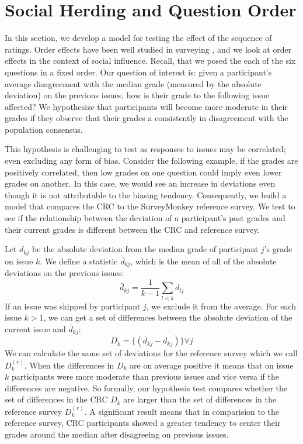 \section{Social Herding and Question Order}
\label{path}
In this section, we develop a model for testing the effect of the sequence of ratings.
Order effects have been well studied in surveying \cite{krosnick1987evaluation}, and we look at order effects in the context of social influence. 
Recall, that we posed the each of the six questions in a fixed order.
Our question of interest is: given a participant's average disagreement with the median grade (measured by the absolute deviation) on the previous issues, how is their grade to the following issue affected?
We hypothesize that participants will become more moderate in their grades if they observe that their grades a consistently in disagreement with the population consensus.

This hypothesis is challenging to test as responses to issues may be correlated; even excluding any form of bias.
Consider the following example, if the grades are positively correlated, then low grades on one question could imply even lower grades on another.
In this case, we would see an increase in deviations even though it is not attributable to the biasing tendency.
Consequently, we build a model that compares the CRC to the SurveyMonkey reference survey.
We test to see if the relationship between the deviation of a participant's past grades and their current grades is different between the CRC and reference survey.

Let $d_{kj}$ be the absolute deviation from the median grade of participant $j$'s grade on issue $k$. 
We define a statistic $\bar{d}_{kj}$, which is the mean of all of the absolute deviations on the previous issues:
\begin{equation}
\bar{d}_{kj} = \frac{1}{k-1} \sum_{l < k}  d_{lj}
\end{equation}
If an issue was skipped by participant $j$, we exclude it from the average.
For each issue $k > 1$, we can get a set of differences between the absolute deviation of the current issue and $\bar{d}_{kj}$:
\begin{equation}
D_k = \{(\bar{d}_{kj}-d_{kj})\} \forall j
\end{equation}
We can calculate the same set of deviations for the reference survey which we call $D_k^{(r)}$.
When the differences in $D_k$ are on average positive it means that on issue $k$ participants were more moderate than previous issues and vice versa if the differences are negative.
So formally, our hypothesis test compares whether the set of differences in the CRC $D_k$ are larger than the set of differences in the reference survey $D_k^{(r)}$.
A significant result means that in comparision to the reference survey, CRC participants showed a greater tendency to center their grades around the median after disagreeing on previous issues.

